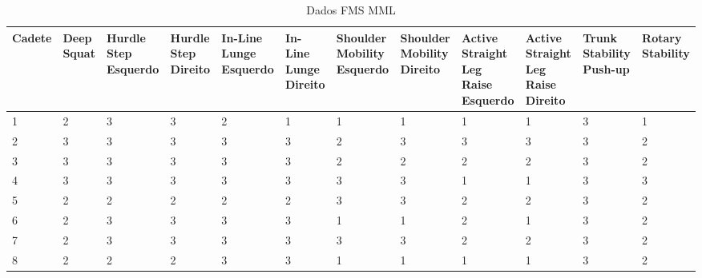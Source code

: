 \begin{landscape}
    
    \begin{table}[h]
        \centering
        \caption{Dados FMS \acrlong{MML}}
        \label{tab:fmsMML}
        \renewcommand{\arraystretch}{1.3}  %
        \begin{adjustbox}{scale=0.9}
        \begin{tabular}{|p{1.8cm}|p{1.6cm}|p{1.6cm}|p{1.6cm}|p{1.6cm}|p{1.6cm}|p{1.6cm}|p{1.6cm}|p{1.6cm}|p{1.6cm}|p{1.6cm}|p{1.6cm}|}
            \hline
            \textbf{Cadete} & \textbf{Deep Squat} & \textbf{Hurdle Step Esquerdo} & \textbf{Hurdle Step Direito} & \textbf{In-Line Lunge Esquerdo} & \textbf{In-Line Lunge Direito} & \textbf{Shoulder Mobility Esquerdo} & \textbf{Shoulder Mobility Direito} & \textbf{Active Straight Leg Raise Esquerdo} & \textbf{Active Straight Leg Raise Direito} & \textbf{Trunk Stability Push-up} & \textbf{Rotary Stability} \\
            \hline
            1 & 2 & 3 & 3 & 2 & 1 & 1 & 1 & 1 & 1 & 3 & 1 \\
            2 & 3 & 3 & 3 & 3 & 3 & 2 & 3 & 3 & 3 & 3 & 2 \\
            3 & 3 & 3 & 3 & 3 & 3 & 2 & 2 & 2 & 2 & 3 & 2 \\
            4 & 3 & 3 & 3 & 3 & 3 & 3 & 3 & 1 & 1 & 3 & 3 \\
            5 & 2 & 2 & 2 & 2 & 2 & 3 & 3 & 2 & 2 & 3 & 2 \\
            6 & 2 & 3 & 3 & 3 & 3 & 1 & 1 & 2 & 1 & 3 & 2 \\
            7 & 2 & 3 & 3 & 3 & 3 & 3 & 3 & 2 & 2 & 3 & 2 \\
            8 & 2 & 2 & 2 & 3 & 3 & 1 & 1 & 1 & 1 & 3 & 2 \\
            \hline
        \end{tabular}
        \end{adjustbox}
    \end{table}
    
    

\end{landscape}